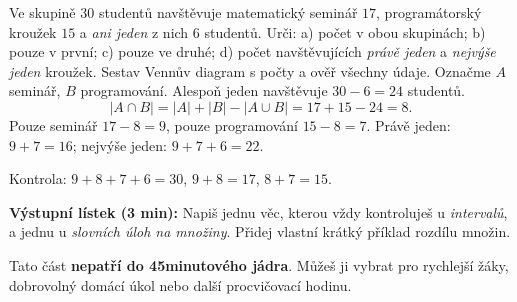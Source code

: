 \documentclass[11pt,a4paper]{article}
\begin{document}
\begin{prikladReseniBox}[title={Samostatná práce 5},breakable=false]
Ve skupině $30$ studentů navštěvuje matematický seminář $17$,
programátorský kroužek $15$ a \emph{ani jeden} z nich $6$ studentů.
Urči: a) počet v obou skupinách; b) pouze v první; c) pouze ve druhé;
d) počet navštěvujících \emph{právě jeden} a \emph{nejvýše jeden} kroužek.
Sestav Vennův diagram s počty a ověř všechny údaje.
\tcblower
Označme $A$ seminář, $B$ programování.
Alespoň jeden navštěvuje $30-6=24$ studentů.
\[
|A\cap B|=|A|+|B|-|A\cup B|=17+15-24=8.
\]
Pouze seminář $17-8=9$, pouze programování $15-8=7$.
Právě jeden: $9+7=16$; nejvýše jeden: $9+7+6=22$.
\begin{center}
\end{center}
Kontrola: $9+8+7+6=30$, $9+8=17$, $8+7=15$.
\end{prikladReseniBox}

\textbf{Výstupní lístek (3 min):} Napiš jednu věc, kterou vždy
kontroluješ u \emph{intervalů}, a jednu u \emph{slovních úloh na množiny}.
Přidej vlastní krátký příklad rozdílu množin.


Tato část \textbf{nepatří do 45minutového jádra}. Můžeš ji vybrat pro rychlejší
žáky, dobrovolný domácí úkol nebo další procvičovací hodinu.
\end{document}

